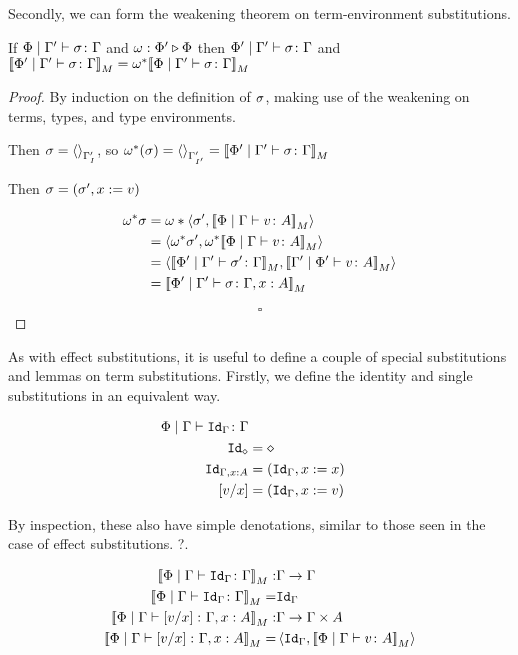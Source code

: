 \documentclass{Report}
\begin{document}
Secondly, we can form the weakening theorem on term-environment substitutions.


\begin{theorem}
    If $\etyperelation{\P}{\G'}{\si}{\G}$ and $\wrelw{\P'}{\P}$ then $\etyperelation{\P'}{\G'}{\si}{\G}$ and $\deno{\etyperelation{\P'}{\G'}{\si}{\G}} = \w\star\deno{\etyperelation{\P}{\G'}{\si}{\G}}$
\end{theorem}

\begin{proof}
    By induction on the definition of $\si$, making use of the weakening on terms, types, and type environments.

    Then $\si = \term{\G'_{I}}$, so $\w\star(\si) = \term{\G'_{I'}} = \deno{\etyperelation{\P'}{\G'}{\si}{\G}}$
    
    Then $\si = (\si',x\setto v)$
    
    \begin{align}
        \w\star\si & = \w*\pr{\si'}{\deno{\gpetyperelation{v}{A}}}\\
        & = \pr{\w\star\si'}{\w\star\deno{\gpetyperelation{v}{A}}}\\
        &=\pr{\deno{\etyperelation{\P'}{\G'}{\si'}{\G}}}{\deno{\etyperelation{\G'}{\P'}{v}{A}}}\\
        &=\deno{\etyperelation{\P'}{\G'}{\si}{\gax}}
    \end{align}

    $$\square$$

\end{proof}

As with effect substitutions, it is useful to define a couple of special substitutions and lemmas on term substitutions. Firstly, we define the identity and single substitutions in an equivalent way.

\begin{align}
    \etyperelation{\P}{\G}{\Id{\G}}{\G}\\
    \Id{\nil} & = \nil\\
    \Id{\gax} & = (\idg, x\setto x)\\
    \ssub{x}{v} & = (\idg, x\setto v)\\
\end{align}

By inspection, these also have simple denotations, similar to those seen in the case of effect substitutions. ?.

\begin{align}
    \deno{\etyperelation{\P}{\G}{\Id{\G}}{\G}}: & \G\rightarrow\G\\
    \deno{\etyperelation{\P}{\G}{\Id{\G}}{\G}} = &  \idg\\
    \deno{\etyperelation{\P}{\G}{\ssub{x}{v}}{\gax}}: & \G\rightarrow \G\times A\\
    \deno{\etyperelation{\P}{\G}{\ssub{x}{v}}{\gax}} = & \pr{\idg}{\deno{\gpetyperelation{v}{A}}}
\end{align}
\end{document}
